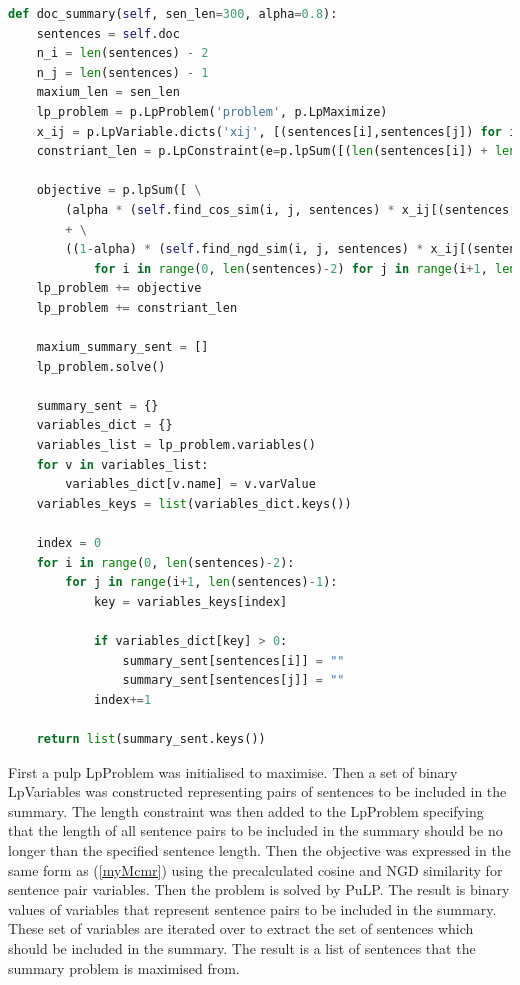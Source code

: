 \begin{lstlisting}[language=Python]
def doc_summary(self, sen_len=300, alpha=0.8):
    sentences = self.doc
    n_i = len(sentences) - 2
    n_j = len(sentences) - 1
    maxium_len = sen_len
    lp_problem = p.LpProblem('problem', p.LpMaximize)
    x_ij = p.LpVariable.dicts('xij', [(sentences[i],sentences[j]) for i in range(0, n_i) for j in range(i+1, n_j)], cat='Binary')
    constriant_len = p.LpConstraint(e=p.lpSum([(len(sentences[i]) + len(sentences[j]))*(x_ij[(sentences[i],sentences[j])]) for i in range(0, n_i) for j in range(i+1, n_j)]),sense=p.LpConstraintLE,rhs=300)

    objective = p.lpSum([ \
        (alpha * (self.find_cos_sim(i, j, sentences) * x_ij[(sentences[i],sentences[j])])) \
        + \
        ((1-alpha) * (self.find_ngd_sim(i, j, sentences) * x_ij[(sentences[i],sentences[j])]))
            for i in range(0, len(sentences)-2) for j in range(i+1, len(sentences)-1)])
    lp_problem += objective
    lp_problem += constriant_len

    maxium_summary_sent = []
    lp_problem.solve()

    summary_sent = {}
    variables_dict = {}
    variables_list = lp_problem.variables()
    for v in variables_list:
        variables_dict[v.name] = v.varValue
    variables_keys = list(variables_dict.keys())

    index = 0
    for i in range(0, len(sentences)-2):
        for j in range(i+1, len(sentences)-1):
            key = variables_keys[index]

            if variables_dict[key] > 0:
                summary_sent[sentences[i]] = ""
                summary_sent[sentences[j]] = ""
            index+=1

    return list(summary_sent.keys())
\end{lstlisting}

First a pulp LpProblem was initialised to maximise. Then a set of binary LpVariables was constructed representing pairs of sentences to be included in the summary. The length constraint was then added to the LpProblem specifying that the length of all sentence pairs to be included in the summary should be no longer than the specified sentence length. Then the objective was expressed in the same form as (\ref{myMcmr}) using the precalculated cosine and NGD similarity for sentence pair variables. Then the problem is solved by PuLP. The result is binary values of variables that represent sentence pairs to be included in the summary. These set of variables are iterated over to extract the set of sentences which should be included in the summary. The result is a list of sentences that the summary problem is maximised from.

